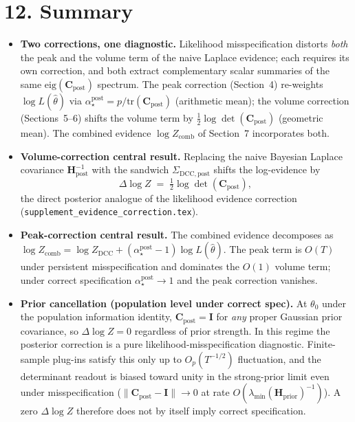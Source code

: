 \documentclass[11pt]{article}
\begin{document}
\section*{12. Summary}

\begin{itemize}
\item \textbf{Two corrections, one diagnostic.} Likelihood misspecification distorts
\emph{both} the peak and the volume term of the naive Laplace evidence; each requires
its own correction, and both extract complementary scalar summaries of the same
$\mathrm{eig}(\mathbf C_{\mathrm{post}})$ spectrum. The peak correction
(Section~4) re-weights $\log L(\hat\theta)$ via
$\alpha_\star^{\mathrm{post}} = p/\mathrm{tr}(\mathbf C_{\mathrm{post}})$ (arithmetic
mean); the volume correction (Sections~5--6) shifts the volume term by
$\tfrac{1}{2}\log\det(\mathbf C_{\mathrm{post}})$ (geometric mean). The combined
evidence $\log Z_{\mathrm{comb}}$ of Section~7 incorporates both.
\item \textbf{Volume-correction central result.} Replacing the naive Bayesian Laplace
covariance $\mathbf H_{\mathrm{post}}^{-1}$ with the sandwich $\Sigma_{\mathrm{DCC},\mathrm{post}}$
shifts the log-evidence by
\[
\Delta\log Z
\;=\;
\tfrac{1}{2}\log\det(\mathbf C_{\mathrm{post}}),
\]
the direct posterior analogue of the likelihood evidence correction
(\texttt{supplement\_evidence\_correction.tex}).
\item \textbf{Peak-correction central result.} The combined evidence decomposes as
$\log Z_{\mathrm{comb}} = \log Z_{\mathrm{DCC}} +
(\alpha_\star^{\mathrm{post}}-1)\log L(\hat\theta)$. The peak term is $O(T)$ under
persistent misspecification and dominates the $O(1)$ volume term; under correct
specification $\alpha_\star^{\mathrm{post}} \to 1$ and the peak correction vanishes.
\item \textbf{Prior cancellation (population level under correct spec).}
At $\theta_0$ under the population information identity, $\mathbf C_{\mathrm{post}} = \mathbf I$
for \emph{any} proper Gaussian prior covariance, so $\Delta\log Z = 0$ regardless of prior
strength. In this regime the posterior correction is a pure likelihood-misspecification
diagnostic. Finite-sample plug-ins satisfy this only up to $O_p(T^{-1/2})$ fluctuation,
and the determinant readout is biased toward unity in the strong-prior limit even under
misspecification ($\|\mathbf C_{\mathrm{post}}-\mathbf I\| \to 0$ at rate
$O(\lambda_{\min}(\mathbf H_{\mathrm{prior}})^{-1})$). A zero $\Delta\log Z$ therefore
does not by itself imply correct specification.

\end{itemize}
\end{document}
